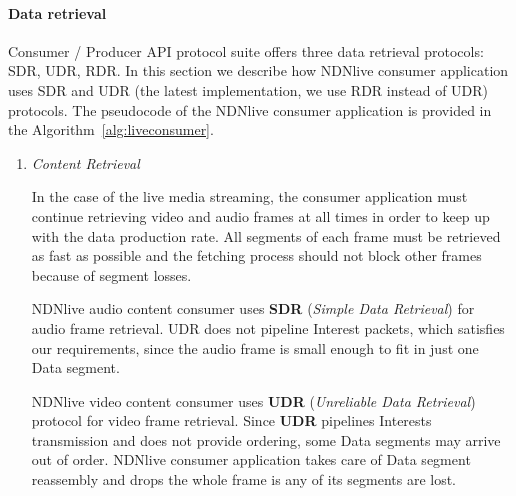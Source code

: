 \paragraph{Data retrieval}
\label{par:NDNlive_dataretrievalprotocol}
\vspace{0.3cm}
Consumer / Producer API protocol suite offers three data retrieval protocols: SDR, UDR, RDR. In this section we describe how NDNlive consumer application uses SDR and UDR (the latest implementation, we use RDR instead of UDR) protocols. The pseudocode of the NDNlive consumer application is provided in the Algorithm~\ref{alg:liveconsumer}. 

\begin{enumerate}
	\item {\textit{Content Retrieval}}
	
In the case of the live media streaming, the consumer application must continue retrieving video and audio frames at all times in order to keep up with the data production rate. All segments of each frame must be retrieved as fast as possible and the fetching process should not block other frames because of segment losses. 

NDNlive audio content consumer uses \textbf{SDR} (\textit{Simple Data Retrieval}) for audio frame retrieval. UDR does not pipeline Interest packets, which satisfies our requirements, since the audio frame is small enough to fit in just one Data segment.	

NDNlive video content consumer uses \textbf{UDR} (\textit{Unreliable Data Retrieval}) protocol for video frame retrieval. Since \textbf{UDR} pipelines Interests transmission and does not provide ordering, some Data segments may arrive out of order. NDNlive consumer application takes care of Data segment reassembly and drops the whole frame is any of its segments are lost. 


\end{enumerate}
